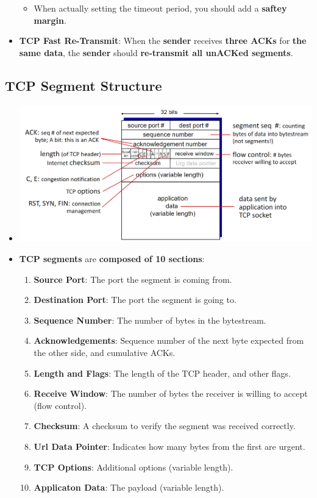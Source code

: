 \documentclass[16pt]{article}
\begin{document}
\begin{itemize}
\begin{enumerate}
        \end{enumerate}
        \begin{itemize}
            \item When actually setting the timeout period, you should add a \textbf{saftey margin}. 
        \end{itemize}
        \item \textbf{TCP Fast Re-Transmit}: When the \textbf{sender} receives \textbf{three ACKs} for \textbf{the same data}, the \textbf{sender} should \textbf{re-transmit all unACKed segments}.
    \end{itemize}

    \subsection*{TCP Segment Structure}
    \begin{itemize}
        \item[] \includegraphics*[width=\textwidth - 25pt]{images/TCP.PNG}
        \item \textbf{TCP segments} are \textbf{composed of 10 sections}:
        \begin{enumerate}
            \item \textbf{Source Port}: The port the segment is coming from.
            \item \textbf{Destination Port}: The port the segment is going to.
            \item \textbf{Sequence Number}: The number of bytes in the bytestream.
            \item \textbf{Acknowledgements}: Sequence number of the next byte expected from the other side, and cumulative ACKs.
            \item \textbf{Length and Flags}: The length of the TCP header, and other flags.
            \item \textbf{Receive Window}: The number of bytes the receiver is willing to accept (flow control).
            \item \textbf{Checksum}: A checksum to verify the segment was received correctly.
            \item \textbf{Url Data Pointer}: Indicates how many bytes from the first are urgent.
            \item \textbf{TCP Options}: Additional options (variable length).
            \item \textbf{Applicaton Data}: The payload (variable length).
        \end{enumerate}
    \end{itemize}
\end{document}
